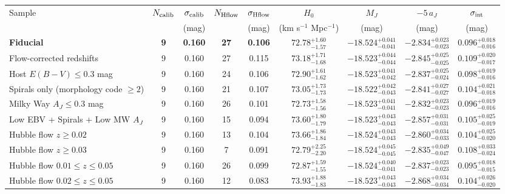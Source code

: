 
\begin{tabular}{|l|cc|cc|cccc|}
\hline
Sample & $N_{\rm calib}$ & $\sigma_{\rm calib}$ & $N_{\rm Hflow}$ & 
$\sigma_{\rm Hflow}$ & $H_0$ & $M_J$ & $-5\,a_J$ & $\sigma_{\rm int}$ \\
& & (mag) & & (mag) & (km s$^{-1}$ Mpc$^{-1}$) & (mag) & (mag) & (mag) \\
\hline
\bf{Fiducial} & \bf{9} & \bf{0.160} & \bf{27} & \bf{0.106} & 
$\mathbf{72.78_{-1.57}^{+1.60}}$ & $\mathbf{-18.524_{-0.041}^{+0.041}}$ & 
$\mathbf{-2.834_{-0.023}^{+0.023}}$ & $\mathbf{0.096_{-0.016}^{+0.018}}$ \\
%
Flow-corrected redshifts &  9 &  0.160 & 27 &  0.115 & 
$73.18_{-1.68}^{+1.71}$ & $-18.523_{-0.044}^{+0.044}$ & 
$-2.845_{-0.025}^{+0.025}$ & $ 0.109_{-0.017}^{+0.020}$ \\
%
Host $E(B-V) \leq 0.3$ mag &  9 &  0.160 & 24 &  0.106 & 
$72.90_{-1.62}^{+1.61}$ & $-18.523_{-0.042}^{+0.041}$ & 
$-2.837_{-0.024}^{+0.025}$ & $ 0.098_{-0.016}^{+0.019}$ \\
%
Spirals only (morphology code $\geq 2$) &  9 &  0.160 & 21 &  0.107 & 
$73.05_{-1.73}^{+1.73}$ & $-18.522_{-0.043}^{+0.042}$ & 
$-2.841_{-0.027}^{+0.027}$ & $ 0.104_{-0.018}^{+0.021}$ \\
%
Milky Way $A_J \leq 0.3$ mag &  9 &  0.160 & 26 &  0.101 & 
$72.73_{-1.56}^{+1.58}$ & $-18.523_{-0.041}^{+0.041}$ & 
$-2.832_{-0.023}^{+0.023}$ & $ 0.096_{-0.016}^{+0.019}$ \\
%
Low EBV + Spirals + Low MW $A_J$ &  9 &  0.160 & 15 &  0.094 & 
$73.60_{-1.79}^{+1.80}$ & $-18.523_{-0.043}^{+0.043}$ & 
$-2.857_{-0.031}^{+0.031}$ & $ 0.105_{-0.019}^{+0.025}$ \\
%
Hubble flow $z \geq 0.02$ &  9 &  0.160 & 13 &  0.104 & 
$73.66_{-1.84}^{+1.86}$ & $-18.524_{-0.043}^{+0.043}$ & 
$-2.860_{-0.033}^{+0.034}$ & $ 0.104_{-0.020}^{+0.025}$ \\
%
Hubble flow $z \geq 0.03$ &  9 &  0.160 &  7 &  0.091 & 
$72.79_{-2.20}^{+2.25}$ & $-18.524_{-0.045}^{+0.045}$ & 
$-2.835_{-0.047}^{+0.049}$ & $ 0.108_{-0.024}^{+0.033}$ \\
%
Hubble flow $0.01 \leq z \leq 0.05$ &  9 &  0.160 & 26 &  0.099 & 
$72.87_{-1.55}^{+1.59}$ & $-18.524_{-0.041}^{+0.040}$ & 
$-2.837_{-0.023}^{+0.023}$ & $ 0.095_{-0.015}^{+0.018}$ \\
%
Hubble flow $0.02 \leq z \leq 0.05$ &  9 &  0.160 & 12 &  0.083 & 
$73.93_{-1.83}^{+1.88}$ & $-18.523_{-0.043}^{+0.043}$ & 
$-2.868_{-0.034}^{+0.034}$ & $ 0.104_{-0.020}^{+0.026}$ \\

\end{tabular}
